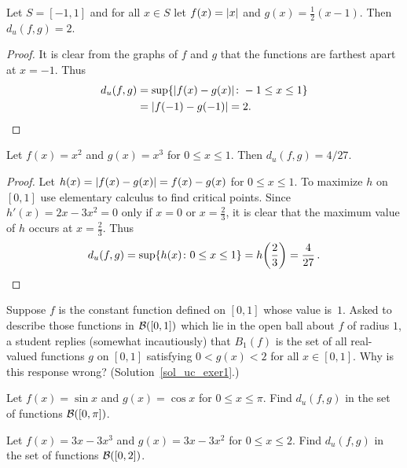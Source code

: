 \begin{exam} Let $S = [-1,1]$ and for all $x \in S$ let $f(x) = \lvert x\rvert$ and $g(x) = \frac12(x-1)$.
Then $d_u(f,g) = 2$.
\end{exam}

\begin{proof} It is clear from the graphs of $f$ and $g$ that the functions are farthest apart at
$x = -1$. Thus
  \begin{align*}
    d_u(f,g) &= \sup\{\lvert f(x) - g(x)\rvert \colon -1 \le x \le 1\} \\
             &= \lvert f(-1) - g(-1)\rvert = 2.   \qedhere
  \end{align*}
\end{proof}

\begin{exam} Let $f(x) = x^2$ and $g(x) = x^3$ for $0 \le x \le 1$.  Then $d_u(f,g) = 4/27$.
\end{exam}

\begin{proof} Let $h(x) = \lvert f(x) - g(x)\rvert = f(x) - g(x)$ for $0 \le x \le 1$.  To maximize $h$
on $[0,1]$ use elementary calculus to find critical points.  Since $h'(x) = 2x - 3x^2 = 0$
only if $x=0$ or $x=\frac23$, it is clear that the maximum value of $h$ occurs at $x =
\frac23$. Thus
  \[ d_u(f,g) = \sup\{h(x) \colon 0 \le x \le 1\}
              = h\biggl(\frac23\biggr) = \frac4{27}\,.  \qedhere \]
\end{proof}

\begin{exer}\label{uc_exer1} Suppose $f$ is the constant function defined on $[0,1]$ whose
value is~$1$.  Asked to describe those functions in $\mathcal{B}([0,1])$ which lie in the open ball
about $f$ of radius $1$, a student replies (somewhat incautiously) that $B_1(f)$ is the set of
all real-valued functions $g$ on $[0,1]$ satisfying $0 < g(x) < 2$ for all $x \in [0,1]$. Why
is this response wrong?  (Solution~\ref{sol_uc_exer1}.)
\end{exer}

\begin{prob} Let $f(x) = \sin x$ and $g(x) = \cos x$ for $0 \le x \le \pi$. Find $d_u(f,g)$
in the set of functions $\mathcal{B}([0,\pi])$.
\end{prob}

\begin{prob} Let $f(x) = 3x - 3x^3$ and $g(x) = 3x - 3x^2$ for $0 \le x \le 2$. Find $d_u(f,g)$
in the set of functions $\mathcal{B}([0,2])$.
\end{prob}

